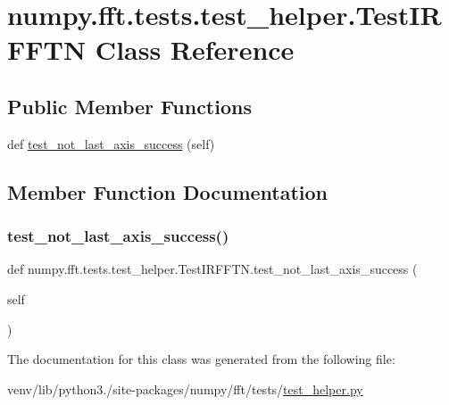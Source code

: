 \hypertarget{classnumpy_1_1fft_1_1tests_1_1test__helper_1_1TestIRFFTN}{}\section{numpy.\+fft.\+tests.\+test\+\_\+helper.\+Test\+I\+R\+F\+F\+TN Class Reference}
\label{classnumpy_1_1fft_1_1tests_1_1test__helper_1_1TestIRFFTN}
\subsection*{Public Member Functions}
\begin{DoxyCompactItemize}
\item 
def \hyperlink{classnumpy_1_1fft_1_1tests_1_1test__helper_1_1TestIRFFTN_a6bc0cb4bdc33a4ab83675f51f98b21f4}{test\+\_\+not\+\_\+last\+\_\+axis\+\_\+success} (self)
\end{DoxyCompactItemize}


\subsection{Member Function Documentation}
\mbox{\label{classnumpy_1_1fft_1_1tests_1_1test__helper_1_1TestIRFFTN_a6bc0cb4bdc33a4ab83675f51f98b21f4}} 
\subsubsection{\texorpdfstring{test\+\_\+not\+\_\+last\+\_\+axis\+\_\+success()}{test\_not\_last\_axis\_success()}}
{\footnotesize\ttfamily def numpy.\+fft.\+tests.\+test\+\_\+helper.\+Test\+I\+R\+F\+F\+T\+N.\+test\+\_\+not\+\_\+last\+\_\+axis\+\_\+success (\begin{DoxyParamCaption}\item[{}]{self }\end{DoxyParamCaption})}



The documentation for this class was generated from the following file\+:\begin{DoxyCompactItemize}
\item 
venv/lib/python3./site-\/packages/numpy/fft/tests/\hyperlink{test__helper_8py}{test\+\_\+helper.\+py}\end{DoxyCompactItemize}
